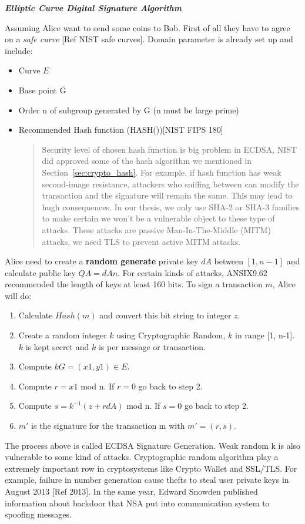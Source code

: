 \bigskip
{\textit {\textbf{Elliptic Curve Digital Signature Algorithm}}}

Assuming Alice want to send some coins to Bob. First of all they have to agree on a \emph{safe curve} [Ref NIST safe curves].
Domain parameter is already set up and include:
\begin{itemize}
  \item Curve $E$
  \item Base point G
  \item Order n of subgroup generated by G (n must be large prime)
  \item Recommended Hash function (HASH())[NIST FIPS 180]
        \begin{quote}
          Security level of chosen hash function is big problem in ECDSA, NIST did approved some of the hash algorithm we mentioned in Section~\ref{sec:crypto_hash}.
          For example, if hash function has weak second-image resistance, attackers who sniffing between can modify the transaction and the signature will remain the same.
          This may lead to hugh consequences.
          In our thesis, we only use SHA-2 or SHA-3 families to make certain we won't be a vulnerable object to these type of attacks. These attacks are passive Man-In-The-Middle (MITM) attacks, we need TLS to prevent active MITM attacks.
        \end{quote}
\end{itemize}

Alice need to create a {\bf random generate} private key $dA$ between $[1, n-1]$ and calculate public key $QA = dAn$.
For certain kinds of attacks, ANSIX9.62 recommended the length of keys at least 160 bits.
To sign a transaction $m$, Alice will do:
\begin{enumerate}
  \item Calculate $Hash(m)$ and convert this bit string to integer $z$.
  \item Create a random integer $k$ using Cryptographic Random, $k$ in range [1, n-1]. $k$ is kept secret and $k$ is per message or transaction.
  \item Compute $kG = (x1, y1) \in E$.
  \item Compute $r=x1$ mod n. If $r = 0$ go back to step 2.
  \item Compute $s=k^{-1}(z + rdA)$ mod n. If $s = 0$ go back to step 2.
  \item $m'$ is the signature for the transaction m with $m' = (r, s)$.
\end{enumerate}
The process above is called ECDSA Signature Generation.
Weak random k is also vulnerable to some kind of attacks.
Cryptographic random algorithm play a extremely important row in cryptosystems like Crypto Wallet and SSL/TLS.
For example, failure in number generation cause thefts to steal user private keys in August 2013 [Ref 2013].
In the same year, Edward Snowden published information about backdoor that NSA put into communication system to spoofing messages.


